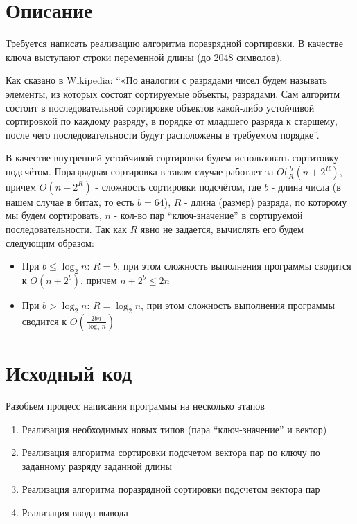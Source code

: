 \section{Описание}
Требуется написать реализацию алгоритма поразрядной сортировки. В качестве ключа выступают строки переменной длины (до 2048 символов).

Как сказано в Wikipedia: \enquote{«По аналогии с разрядами чисел будем называть элементы, из которых состоят сортируемые объекты, разрядами. Сам алгоритм состоит в последовательной сортировке объектов какой-либо устойчивой сортировкой по каждому разряду, в порядке от младшего разряда к старшему, после чего последовательности будут расположены в требуемом порядке}.

В качестве внутренней устойчивой сортировки будем использовать сортитовку подсчётом. Поразрядная сортировка в таком случае работает за $O(\frac{b}{R}(n+2^R)$, причем $O(n+2^R)$ - сложность сортировки подсчётом, где $b$ - длина числа (в нашем случае в битах, то есть $b=64$), $R$ - длина (размер) разряда, по которому мы будем сортировать, $n$ - кол-во пар \enquote{ключ-значение} в сортируемой последовательности. Так как $R$ явно не задается, вычислять его будем следующим образом:

\begin{itemize}
    \item При $b\leq\log_2 n$: $R=b$, при этом сложность выполнения программы сводится к $O(n+2^b)$, причем $n+2^b\leq2n$ 
    \item При $b>\log_2 n$: $R=\log_2n$, при этом сложность выполнения программы сводится к $O(\frac{2bn}{\log_2n})$
\end{itemize}

\pagebreak

\section{Исходный код}
Разобьем процесс написания программы на несколько этапов

\begin{enumerate}
    \item Реализация необходимых новых типов (пара \enquote{ключ-значение} и вектор)
    \item Реализация алгоритма сортировки подсчетом вектора пар по ключу по заданному разряду заданной длины
    \item Реализация алгоритма поразрядной сортировки подсчетом вектора пар
    \item Реализация ввода-вывода
\end{enumerate}

